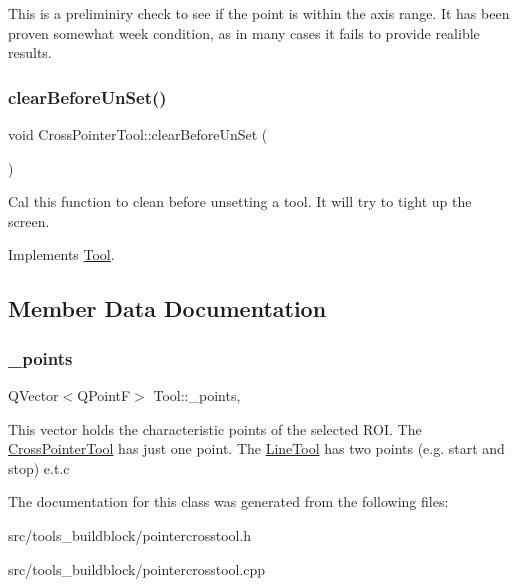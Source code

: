 This is a preliminiry check to see if the point is within the axis range. It has been proven somewhat week condition, as in many cases it fails to provide realible results. \mbox{\label{classCrossPointerTool_a99e1b8f0669837dc5524c446e3dd401c}} 
\subsubsection{\texorpdfstring{clear\+Before\+Un\+Set()}{clearBeforeUnSet()}}
{\footnotesize\ttfamily void Cross\+Pointer\+Tool\+::clear\+Before\+Un\+Set (\begin{DoxyParamCaption}{ }\end{DoxyParamCaption})\hspace{0.3cm}{\ttfamily [virtual]}}

Cal this function to clean before unsetting a tool. It will try to tight up the screen. 

Implements \mbox{\hyperlink{classTool_a7d9e7d03f4a34d71850cbbfc16ca8532}{Tool}}.



\subsection{Member Data Documentation}
\mbox{\label{classTool_a68be77a2e364a7b13d7206388ba5843e}} 
\subsubsection{\texorpdfstring{\+\_\+points}{\_points}}
{\footnotesize\ttfamily Q\+Vector$<$Q\+PointF$>$ Tool\+::\+\_\+points\hspace{0.3cm}{\ttfamily [protected]}, {\ttfamily [inherited]}}

This vector holds the characteristic points of the selected R\+OI. The \mbox{\hyperlink{classCrossPointerTool}{Cross\+Pointer\+Tool}} has just one point. The \mbox{\hyperlink{classLineTool}{Line\+Tool}} has two points (e.\+g. start and stop) e.\+t.\+c 

The documentation for this class was generated from the following files\+:\begin{DoxyCompactItemize}
\item 
src/tools\+\_\+buildblock/pointercrosstool.\+h\item 
src/tools\+\_\+buildblock/pointercrosstool.\+cpp\end{DoxyCompactItemize}
